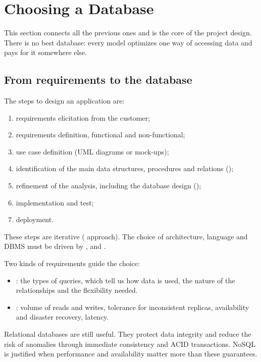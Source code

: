 \section{Choosing a Database}\label{sec:choosing}

This section connects all the previous ones and is the core of the project design. There is no best database: every model optimizes one way of accessing data and pays for it somewhere else.

\subsection{From requirements to the database}
The steps to design an application are:
\begin{enumerate}
  \item requirements elicitation from the customer;
  \item requirements definition, functional and non-functional;
  \item use case definition (UML diagrams or mock-ups);
  \item identification of the main data structures, procedures and relations ();
  \item refinement of the analysis, including the database design ();
  \item implementation and test;
  \item deployment.
\end{enumerate}
These steps are iterative ( approach). The choice of architecture, language and DBMS must be driven by ,  and .

Two kinds of requirements guide the choice:
\begin{itemize}
  \item {}: the types of queries, which tell us how data is used, the nature of the relationships and the flexibility needed.
  \item {}: volume of reads and writes, tolerance for inconsistent replicas, availability and disaster recovery, latency.
\end{itemize}

\begin{remark}
Relational databases are still useful. They protect data integrity and reduce the risk of anomalies through immediate consistency and ACID transactions. NoSQL is justified when performance and availability matter more than these guarantees.
\end{remark}

